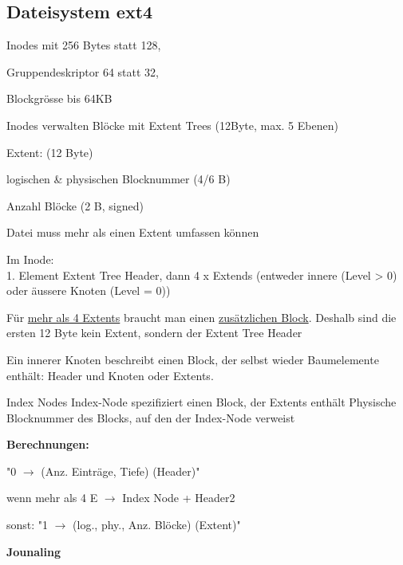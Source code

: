 \begin{multicols*}{5}
\vspace{-5pt}


\section{Dateisystem ext4}
\begin{compactitem}[$\bullet$]
\item Inodes mit 256 Bytes statt 128, 
\item Gruppendeskriptor 64 statt 32, 
\item Blockgrösse bis 64KB
\item Inodes verwalten Blöcke mit Extent Trees (12Byte, max. 5 Ebenen)
\end{compactitem}


\textcolor{h}{Extent:} (12 Byte)
\begin{compactitem}[$\bullet$]
	\item logischen \& physischen Blocknummer (4/6 B)
	\item Anzahl Blöcke (2 B, signed)
	\item Datei muss mehr als einen Extent umfassen können
\end{compactitem}



Im \textcolor{h}{Inode:}\\
1. Element Extent Tree Header, dann 4 x Extends (entweder innere (Level > 0) oder äussere Knoten (Level = 0))

Für \underline{mehr als 4 Extents} braucht man einen \underline{zusätzlichen Block}. 
Deshalb sind die ersten 12 Byte kein Extent, sondern der Extent Tree Header

Ein innerer Knoten beschreibt einen Block, der selbst wieder Baumelemente enthält: Header und Knoten oder Extents.



\textcolor{h}{Index Nodes}
Index-Node spezifiziert einen Block, der Extents enthält
Physische Blocknummer des Blocks, auf den der Index-Node verweist

\textbf{Berechnungen:}
\begin{compactenum}[1.]
	\item "0 $\rightarrow$ (Anz. Einträge, Tiefe) (Header)"
	\item wenn mehr als 4 E $\rightarrow$ Index Node + Header2
	\item sonst: "1 $\rightarrow$ (log., phy., Anz. Blöcke) (Extent)"
\end{compactenum}

\textcolor{h}{\textbf{Jounaling}}


\end{multicols*}
